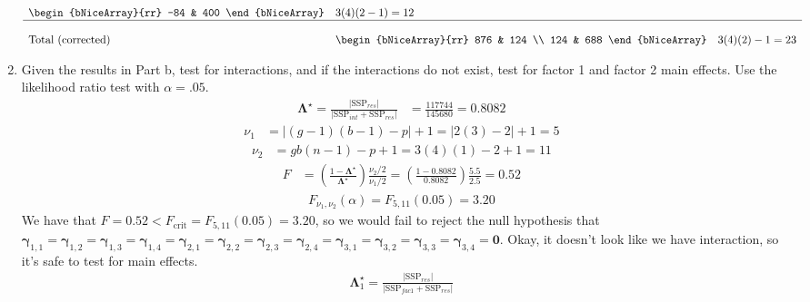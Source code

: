 \begin{enumerate}[label= (\alph*)]
\[\begin{array}{lll}
\begin{bNiceArray}{rr}
            -84 & 400
        \end{bNiceArray}
        &
        3(4)(2-1) = 12
        \\
        \hline \\
        \text{Total (corrected)}
        &
        \begin{bNiceArray}{rr}
            876 & 124 \\
            124 & 688
        \end{bNiceArray}
        &
        3(4)(2) - 1 = 23
    \end{array}
    \]
    \item Given the results in Part b, test for interactions, and if the interactions do not
    exist, test for factor 1 and factor 2 main effects. Use the likelihood ratio test with
    $\alpha= .05$.
    \begin{align*}
        \bm{\Lambda}^{\star} = \frac{|\text{SSP}_{res}|}{|\text{SSP}_{int} + \text{SSP}_{res}|}
        & =
        \frac{117744}{145680}
        =
        0.8082
    \end{align*}
    \begin{align*}
        \nu_{1}
        & =
        |(g-1)(b-1) - p| + 1 = |2(3) - 2| + 1 = 5
    \end{align*}
    \begin{align*}
        \nu_{2}
        & =
        gb(n-1) - p + 1 = 3(4)(1) - 2 + 1 = 11
    \end{align*}
    \begin{align*}
        F
        & =
        \left(\frac{1 - \bm{\Lambda}^{\star}}{\bm{\Lambda^{\star}}}\right)\frac{\nu_{2}/2}{\nu_{1}/2}
        =
        \left(\frac{1 - 0.8082}{0.8082}\right)\frac{5.5}{2.5}
        =
        0.52
    \end{align*}
    \begin{align*}
        F_{\nu_{1}, \nu_{2}}(\alpha)
        =
        F_{5, 11}(0.05)
        =
        3.20
    \end{align*}
    We have that $F = 0.52 < F_{\text{crit}} = F_{5, 11}(0.05) = 3.20$, so we would fail to reject the null hypothesis that $\bm{\gamma}_{1,1}=\bm{\gamma}_{1,2}=\bm{\gamma}_{1,3}=\bm{\gamma}_{1,4}=\bm{\gamma}_{2,1}=\bm{\gamma}_{2,2}=\bm{\gamma}_{2,3}=\bm{\gamma}_{2,4}=\bm{\gamma}_{3,1}=\bm{\gamma}_{3,2}=\bm{\gamma}_{3,3}=\bm{\gamma}_{3,4}=\textbf{0}$. Okay, it doesn't look like we have interaction, so it's safe to test for main effects.
    \begin{align*}
        \bm{\Lambda}_{1}^{\star} = \frac{|\text{SSP}_{res}|}{|\text{SSP}_{fac1} + \text{SSP}_{res}|}

\end{align*}
\end{enumerate}
